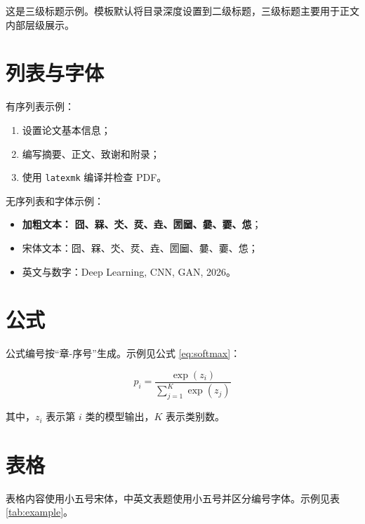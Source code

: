 这是三级标题示例。模板默认将目录深度设置到二级标题，三级标题主要用于正文内部层级展示。

\section{列表与字体}

有序列表示例：

\begin{enumerate}
    \item 设置论文基本信息；
    \item 编写摘要、正文、致谢和附录；
    \item 使用 \texttt{latexmk} 编译并检查 PDF。
\end{enumerate}

无序列表和字体示例：

\begin{itemize}
  \item \textbf{加粗文本：} \textbf{囧、槑、氼、烎、垚、圐圙、嘦、嫑、怹}；
    \item 宋体文本：囧、槑、氼、烎、垚、圐圙、嘦、嫑、怹；
    \item 英文与数字：Deep Learning, CNN, GAN, 2026。
\end{itemize}

\section{公式}

公式编号按“章-序号”生成。示例见公式 \ref{eq:softmax}：

\begin{equation}
    p_i = \frac{\exp(z_i)}{\sum_{j=1}^{K}\exp(z_j)}
    \label{eq:softmax}
\end{equation}

其中，$z_i$ 表示第 $i$ 类的模型输出，$K$ 表示类别数。

\section{表格}

表格内容使用小五号宋体，中英文表题使用小五号并区分编号字体。示例见表 \ref{tab:example}。

